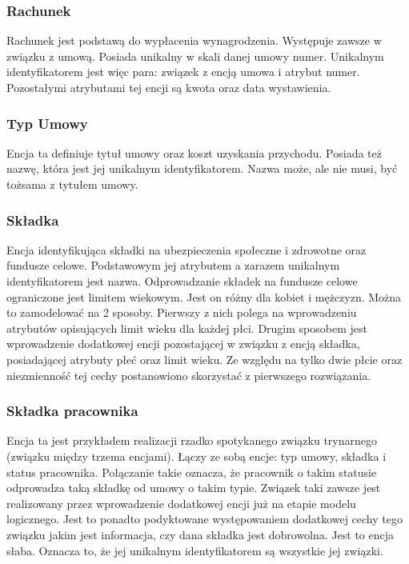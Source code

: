 \subsubsection{Rachunek}
Rachunek jest podstawą do wypłacenia wynagrodzenia. Występuje zawsze w związku z umową. Posiada unikalny w skali danej umowy numer. Unikalnym identyfikatorem jest więc para: związek z encją umowa i atrybut numer. Pozostałymi atrybutami tej encji są kwota oraz data wystawienia.

\subsubsection{Typ Umowy}
Encja ta definiuje tytuł umowy oraz koszt uzyskania przychodu. Posiada też nazwę, która jest jej unikalnym identyfikatorem. Nazwa może, ale nie musi, być tożsama z tytułem umowy.

\subsubsection{Składka}
Encja identyfikująca składki na ubezpieczenia społeczne i zdrowotne oraz fundusze celowe. Podstawowym jej atrybutem a zarazem unikalnym identyfikatorem jest nazwa. Odprowadzanie składek na fundusze celowe ograniczone jest limitem wiekowym. Jest on różny dla kobiet i mężczyzn. Można to zamodelować na 2 sposoby. Pierwszy z nich polega na wprowadzeniu atrybutów opisujących limit wieku dla każdej płci. Drugim sposobem jest wprowadzenie dodatkowej encji pozostającej w związku z encją składka, posiadającej atrybuty płeć oraz limit wieku. Ze względu na tylko dwie płcie oraz niezmienność tej cechy postanowiono skorzystać z pierwszego rozwiązania.

\subsubsection{Składka pracownika}
Encja ta jest przykładem realizacji rzadko spotykanego związku trynarnego (związku między trzema encjami).  Łączy ze sobą encje: typ umowy, składka i status pracownika. Połączanie takie oznacza, że pracownik o takim statusie odprowadza taką składkę od umowy o takim typie. Związek taki zawsze jest realizowany przez wprowadzenie dodatkowej encji już na etapie modelu logicznego.  Jest to ponadto podyktowane występowaniem dodatkowej cechy tego związku jakim jest informacja, czy dana składka jest dobrowolna. Jest to encja słaba. Oznacza to, że jej unikalnym identyfikatorem są wszystkie jej związki.



